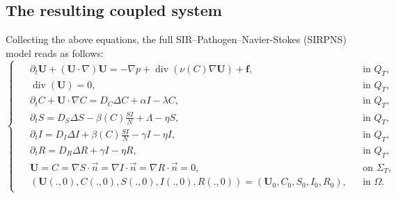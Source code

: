 \documentclass[10pt,number,preprint,times]{elsarticle}
\numberwithin{equation}{section} %
\begin{document}
	\subsection{{The resulting coupled system}}
	\noindent
	Collecting the above equations, the full SIR--Pathogen--Navier-Stokes (SIRPNS) model reads as follows:
	\begin{equation}\label{SIRCNS}
		\begin{cases}
			\begin{split}
				&\partial_t \boldsymbol{U} +(\boldsymbol{U}\cdot\nabla)\boldsymbol{U} = -\nabla p + \operatorname{div}(\nu(C)\nabla\boldsymbol{U} ) + \boldsymbol{f}, &&\text{in } Q_T,\\
				&\operatorname{div}(\boldsymbol{U})=0, &&\text{in } Q_T,\\
				&\partial_t C + \boldsymbol{U}\cdot\nabla C= D_C\Delta C + \alpha I  - \lambda C, &&\text{in } Q_T,\\
				&\partial_t S= D_S\Delta S - \beta(C)\frac{S I}{N}+\Lambda - \eta S, &&\text{in } Q_T,\\
				&\partial_t I= D_I\Delta I + \beta(C)\frac{S I}{N} - \gamma I - \eta I, &&\text{in } Q_T,\\
				&\partial_t R= D_R\Delta R + \gamma I- \eta R, &&\text{in } Q_T,\\
				&\boldsymbol{U}=C=\nabla S \cdot \overrightarrow{n}=\nabla I \cdot \overrightarrow{n}=\nabla R \cdot \overrightarrow{n}=0,  && \text{on } \Sigma_T,\\
				&(\boldsymbol{U}(.,0),C(.,0),S(.,0),I(.,0),R(.,0))=(\boldsymbol{U}_0,C_0,S_0,I_0,R_0) ,  && \text{in }\Omega.
			\end{split}
		\end{cases}
	\end{equation}
	
\end{document}

